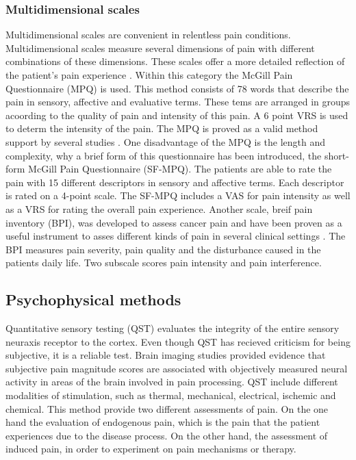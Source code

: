 \subsubsection{Multidimensional scales}
Multidimensional scales are convenient in relentless pain conditions. Multidimensional scales measure several dimensions of pain with different combinations of these dimensions. These scales offer a more detailed reflection of the patient's pain experience \cite{art and science}. Within this category the McGill Pain Questionnaire (MPQ) is used. This method consists of 78 words that describe the pain in sensory, affective and evaluative terms. These tems are arranged in groups acoording to the quality of pain and intensity of this pain. A 6 point VRS is used to determ the intensity of the pain. The MPQ is proved as a valid method support by several studies \cite{libro pain}.  One disadvantage of the MPQ is the length and complexity, why a brief form of this questionnaire has been introduced, the short-form McGill Pain Questionnaire (SF-MPQ). The patients are able to rate the pain with 15 different descriptors in sensory and affective terms. Each descriptor is rated on a 4-point scale. The SF-MPQ includes a VAS for pain intensity as well as a VRS for rating the overall pain experience. Another scale, breif pain inventory (BPI), was developed to assess cancer pain and have been proven as a useful instrument to asses different kinds of pain in several clinical settings \cite{libro pain}. The BPI measures pain severity, pain quality and the disturbance caused in the patients daily life. Two subscale scores pain intensity and pain interference.  


\subsection{Psychophysical methods}
Quantitative sensory testing (QST) evaluates the integrity of the entire sensory neuraxis receptor to the cortex. Even though QST has recieved criticism for being subjective, it is a reliable test. Brain imaging studies provided evidence that subjective pain magnitude scores are associated with objectively measured neural activity in areas of the brain involved in pain processing. QST include different modalities of stimulation, such as thermal, mechanical, electrical, ischemic and chemical. This method provide two different assessments of pain. On the one hand the  evaluation of endogenous pain, which is the pain that the patient experiences due to the disease process. On the other hand, the assessment of induced pain, in order to experiment on pain mechanisms or therapy. \cite{neurop_exam}

